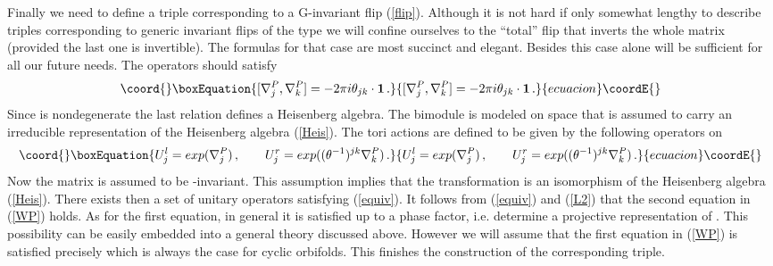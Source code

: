 \documentclass[a4paper,a4paper]{article}
\begin{document}
{Finally we need to define a triple corresponding to a G-invariant flip (\ref{flip}). Although it is not hard 
if only somewhat lengthy to describe triples corresponding to generic \coordHE{} invariant flips of the type \coordHE{} 
we will confine ourselves to the ``total'' flip that inverts the whole matrix \myHighlight{$\theta$}\coordHE{} (provided the last one is 
invertible). The formulas for that case are most succinct and elegant. Besides this case alone will be 
sufficient for all our future needs.  
The operators \coordHE{} should   satisfy 
\begin{equation}\coord{}\boxEquation{\label{Heis}
[\nabla^{P}_{j}, \nabla_{k}^{P}] = -2\pi i \theta_{jk} \cdot {\bf 1}\, .
}{[\nabla^{P}_{j}, \nabla_{k}^{P}] = -2\pi i \theta_{jk} \cdot {\bf 1}\, .
}{ecuacion}\coordE{}\end{equation}
Since \myHighlight{$\theta$}\coordHE{} is nondegenerate the last relation defines a Heisenberg algebra. 
The \coordHE{} bimodule is modeled on \coordHE{} space that is  
assumed to carry an irreducible representation of the Heisenberg algebra (\ref{Heis}). 
The tori actions are defined to be given by the following operators on   \coordHE{}
\begin{equation}\coord{}\boxEquation{ \label{L2}
U^{l}_{j} = exp(\nabla^{P}_{j}) \, , \qquad U^{r}_{j} = exp((\theta^{-1})^{jk}\nabla^{P}_{k}) \, .  
}{ U^{l}_{j} = exp(\nabla^{P}_{j}) \, , \qquad U^{r}_{j} = exp((\theta^{-1})^{jk}\nabla^{P}_{k}) \, .  
}{ecuacion}\coordE{}\end{equation}
Now the matrix \myHighlight{$\theta$}\coordHE{} is assumed to be \coordHE{}-invariant. This assumption implies that 
 the  transformation \coordHE{} 
is an isomorphism of the Heisenberg algebra (\ref{Heis}). There exists then a set of unitary operators 
\coordHE{} satisfying (\ref{equiv}). It follows from (\ref{equiv}) and (\ref{L2}) that  the second equation in (\ref{WP})
holds. As for the first equation, in general it is 
satisfied up to a phase factor, i.e. \coordHE{} determine a projective representation of \coordHE{}. 
This possibility can be easily embedded into a general theory discussed above. However we will 
assume that the first equation in (\ref{WP}) is satisfied precisely which is always the case for 
cyclic orbifolds. This finishes the construction of the corresponding triple.


}
\end{document}
